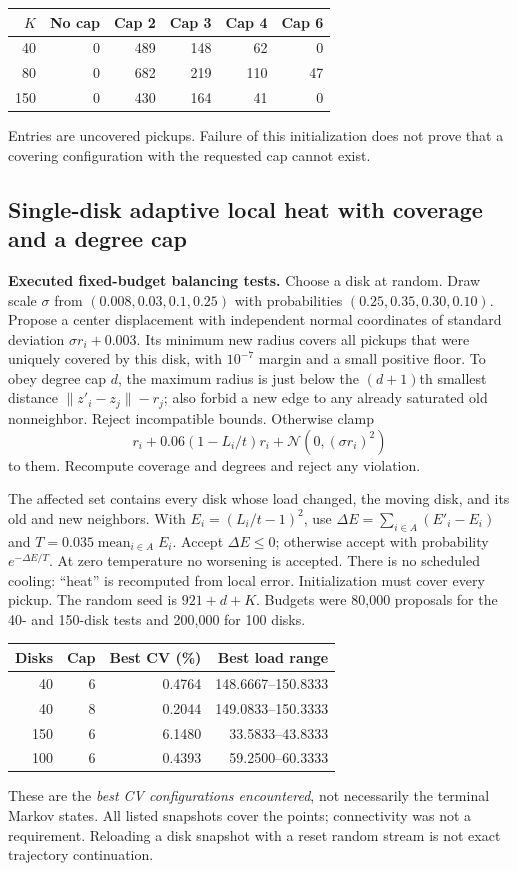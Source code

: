 \documentclass[11pt]{article}
\begin{document}
\begin{center}\begin{tabular}{rrrrrr}
\toprule $K$ & No cap & Cap 2 & Cap 3 & Cap 4 & Cap 6\\\midrule
40 &0&489&148&62&0\\80&0&682&219&110&47\\150&0&430&164&41&0\\\bottomrule
\end{tabular}\end{center}
Entries are uncovered pickups. Failure of this initialization does not prove
that a covering configuration with the requested cap cannot exist.

\subsection{Single-disk adaptive local heat with coverage and a degree cap}
\label{sec:disk-heat}
\textbf{Executed fixed-budget balancing tests.}
Choose a disk at random. Draw scale $\sigma$ from
$(0.008,0.03,0.1,0.25)$ with probabilities $(0.25,0.35,0.30,0.10)$.
Propose a center displacement with independent normal coordinates of standard
deviation $\sigma r_i+0.003$. Its minimum new radius covers all pickups that
were uniquely covered by this disk, with $10^{-7}$ margin and a small positive
floor. To obey degree cap $d$, the maximum radius is just below the $(d+1)$th
smallest distance $\|z'_i-z_j\|-r_j$; also forbid a new edge to any already
saturated old nonneighbor. Reject incompatible bounds. Otherwise clamp
\[
 r_i+0.06(1-L_i/t)r_i+\mathcal N(0,(\sigma r_i)^2)
\]
to them. Recompute coverage and degrees and reject any violation.

The affected set contains every disk whose load changed, the moving disk, and
its old and new neighbors. With $E_i=(L_i/t-1)^2$, use
$\Delta E=\sum_{i\in A}(E'_i-E_i)$ and
$T=0.035\operatorname{mean}_{i\in A}E_i$.
Accept $\Delta E\leq0$; otherwise accept with probability $e^{-\Delta E/T}$.
At zero temperature no worsening is accepted. There is no scheduled cooling:
``heat'' is recomputed from local error. Initialization must cover every pickup.
The random seed is $921+d+K$. Budgets were 80,000 proposals for the 40- and
150-disk tests and 200,000 for 100 disks.

\begin{center}\begin{tabular}{rrrr}
\toprule Disks & Cap & Best CV (\%) & Best load range\\\midrule
40&6&0.4764&148.6667--150.8333\\
40&8&0.2044&149.0833--150.3333\\
150&6&6.1480&33.5833--43.8333\\
100&6&0.4393&59.2500--60.3333\\\bottomrule
\end{tabular}\end{center}
These are the \emph{best CV configurations encountered}, not necessarily the
terminal Markov states. All listed snapshots cover the points; connectivity was
not a requirement. Reloading a disk snapshot with a reset random stream is not
exact trajectory continuation.
\end{document}
